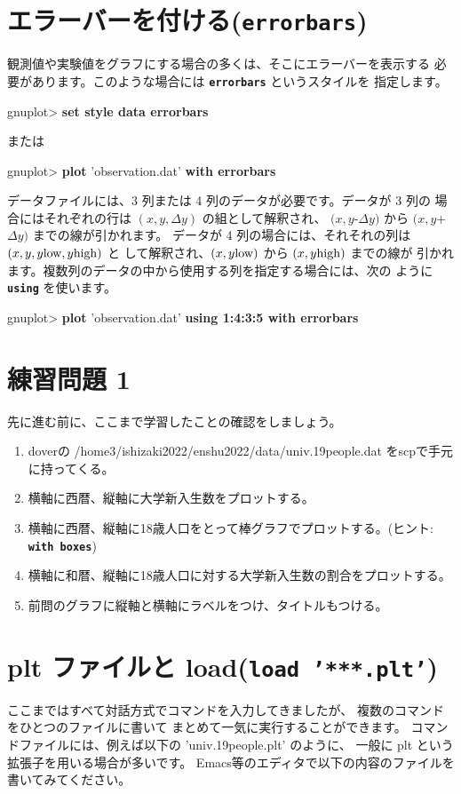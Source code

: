 \documentclass[a4j]{ujarticle} %
\newenvironment{terminal}{%
  \begin{center}
   \begin{minipage}{.8\textwidth}
    \setlength{\FrameSep}{.5\FrameSep}%
    \begin{framed}\ttfamily\small%
     \setlength\baselineskip{.85\baselineskip}%
}{%
    \end{framed}
   \end{minipage}
  \end{center}%
}
\begin{document}
\section{エラーバーを付ける({\tt\bf errorbars})}
観測値や実験値をグラフにする場合の多くは、そこにエラーバーを表示する
必要があります。このような場合には {\tt\bf errorbars} というスタイルを
指定します。
\begin{terminal}
gnuplot> {\bf set style data errorbars}
\end{terminal}
または
\begin{terminal}
gnuplot> {\bf plot} 'observation.dat' {\bf with errorbars}
\end{terminal}

データファイルには、3 列または 4 列のデータが必要です。データが 3 列の
場合にはそれぞれの行は $(x,y,\Delta y)$ の組として解釈され、
$(x,y$-$\Delta y)$ から $(x,y$+$\Delta y)$ までの線が引かれます。
データが 4 列の場合には、それそれの列は $(x,y,y{\rm low},y{\rm high})$ と
して解釈され、$(x,y{\rm low})$ から $(x,y{\rm high})$ までの線が
引かれます。複数列のデータの中から使用する列を指定する場合には、次の
ように {\tt\bf using} を使います。
\begin{terminal}
gnuplot> {\bf plot} 'observation.dat' {\bf using 1:4:3:5 with errorbars}
\end{terminal}
%

\section{練習問題 1}
先に進む前に、ここまで学習したことの確認をしましょう。
\begin{enumerate}
\item
     doverの /home3/ishizaki2022/enshu2022/data/univ.19people.dat をscpで手元に持ってくる。
\item
     横軸に西暦、縦軸に大学新入生数をプロットする。
\item
     横軸に西暦、縦軸に18歳人口をとって棒グラフでプロットする。(ヒント:{\tt\bf
     with boxes})
\item
     横軸に和暦、縦軸に18歳人口に対する大学新入生数の割合をプロットする。
\item
     前問のグラフに縦軸と横軸にラベルをつけ、タイトルもつける。\\
\end{enumerate}

\section{plt ファイルと load({\tt\bf load '***.plt'})}
ここまではすべて対話方式でコマンドを入力してきましたが、
複数のコマンドをひとつのファイルに書いて
まとめて一気に実行することができます。
コマンドファイルには、例えば以下の 'univ.19people.plt' のように、
一般に plt という拡張子を用いる場合が多いです。
Emacs等のエディタで以下の内容のファイルを書いてみてください。
\end{document}
